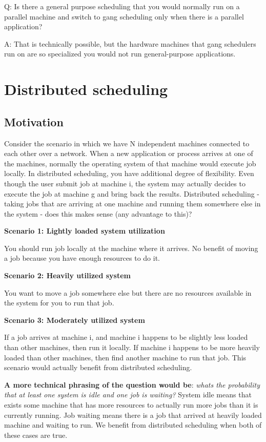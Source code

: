 \documentclass[twoside]{article}
\begin{document}
Q: Is there a general purpose scheduling that you would normally run on a parallel machine and switch to gang scheduling only when there is a parallel application?

A: That is technically possible, but the hardware machines that gang schedulers run on are so specialized you would not run general-purpose applications.


\section{Distributed scheduling}

\subsection{Motivation}

Consider the scenario in which we have N independent machines connected to each other over a network. When a new application or process arrives at one of the machines, normally the operating system of that machine would execute job locally. In distributed scheduling, you have additional degree of flexibility. Even though the user submit job at machine i, the system may actually decides to execute the job at machine g and bring back the results. Distributed scheduling - taking jobs that are arriving at one machine and running them somewhere else in the system - does this makes sense (any advantage to this)?

\textbf{Scenario 1: Lightly loaded system utilization}
  
You should run job locally at the machine where it arrives. No benefit of moving a job because you have enough resources to do it.

\textbf{Scenario 2: Heavily utilized system}

You want to move a job somewhere else but there are no resources available in the system for you to run that job.
  
\textbf{Scenario 3: Moderately utilized system}

If a job arrives at machine i, and machine i happens to be slightly less loaded than other machines, then run it locally. If machine i happens to be more heavily loaded than other machines, then find another machine to run that job. This scenario would actually benefit from distributed scheduling.


\textbf{A more technical phrasing of the question would be}: \textit{what\textsc{}s the probability that at least one system is idle and one job is waiting?} System idle means that exists some machine that has more resources to actually run more jobs than it is currently running. Job waiting means there is a job that arrived at heavily loaded machine and waiting to run. We benefit from distributed scheduling when both of these cases are true.
\end{document}
